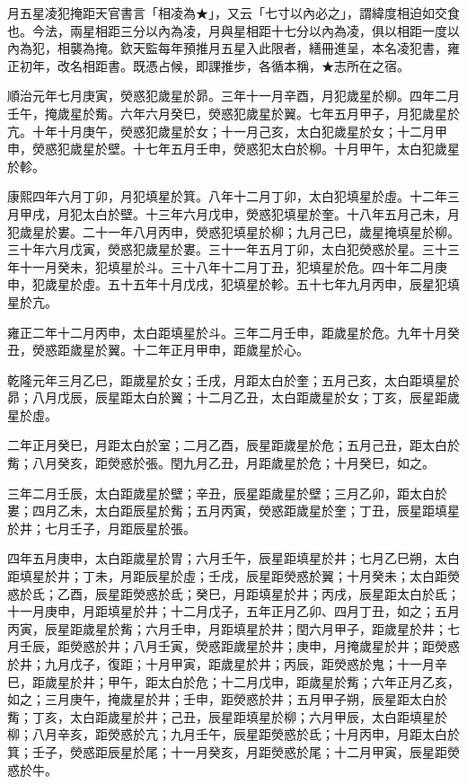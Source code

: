 \begin{pinyinscope}
月五星凌犯掩距天官書言「相凌為★」，又云「七寸以內必之」，謂緯度相迫如交食也。今法，兩星相距三分以內為凌，月與星相距十七分以內為凌，俱以相距一度以內為犯，相襲為掩。欽天監每年預推月五星入此限者，繕冊進呈，本名凌犯書，雍正初年，改名相距書。既憑占候，即課推步，各循本稱，★志所在之宿。

順治元年七月庚寅，熒惑犯歲星於昴。三年十一月辛酉，月犯歲星於柳。四年二月壬午，掩歲星於觜。六年六月癸巳，熒惑犯歲星於翼。七年五月甲子，月犯歲星於亢。十年十月庚午，熒惑犯歲星於女；十一月己亥，太白犯歲星於女；十二月甲申，熒惑犯歲星於壁。十七年五月壬申，熒惑犯太白於柳。十月甲午，太白犯歲星於軫。

康熙四年六月丁卯，月犯填星於箕。八年十二月丁卯，太白犯填星於虛。十二年三月甲戌，月犯太白於壁。十三年六月戊申，熒惑犯填星於奎。十八年五月己未，月犯歲星於婁。二十一年八月丙申，熒惑犯填星於柳；九月己巳，歲星掩填星於柳。三十年六月戊寅，熒惑犯歲星於婁。三十一年五月丁卯，太白犯熒惑於星。三十三年十一月癸未，犯填星於斗。三十八年十二月丁丑，犯填星於危。四十年二月庚申，犯歲星於虛。五十五年十月戊戌，犯填星於軫。五十七年九月丙申，辰星犯填星於亢。

雍正二年十二月丙申，太白距填星於斗。三年二月壬申，距歲星於危。九年十月癸丑，熒惑距歲星於翼。十二年正月甲申，距歲星於心。

乾隆元年三月乙巳，距歲星於女；壬戌，月距太白於奎；五月己亥，太白距填星於昴；八月戊辰，辰星距太白於翼；十二月乙丑，太白距歲星於女；丁亥，辰星距歲星於虛。

二年正月癸巳，月距太白於室；二月乙酉，辰星距歲星於危；五月己丑，距太白於觜；八月癸亥，距熒惑於張。閏九月乙丑，月距歲星於危；十月癸巳，如之。

三年二月壬辰，太白距歲星於壁；辛丑，辰星距歲星於壁；三月乙卯，距太白於婁；四月乙未，太白距辰星於觜；五月丙寅，熒惑距歲星於奎；丁丑，辰星距填星於井；七月壬子，月距辰星於張。

四年五月庚申，太白距歲星於胃；六月壬午，辰星距填星於井；七月乙巳朔，太白距填星於井；丁未，月距辰星於虛；壬戌，辰星距熒惑於翼；十月癸未；太白距熒惑於氐；乙酉，辰星距熒惑於氐；癸巳，月距填星於井；丙戌，辰星距太白於氐；十一月庚申，月距填星於井；十二月戊子，五年正月乙卯、四月丁丑，如之；五月丙寅，辰星距歲星於觜；六月壬申，月距填星於井；閏六月甲子，距歲星於井；七月壬辰，距熒惑於井；八月壬寅，熒惑距歲星於井；庚申，月掩歲星於井；距熒惑於井；九月戊子，復距；十月甲寅，距歲星於井；丙辰，距熒惑於鬼；十一月辛巳，距歲星於井；甲午，距太白於危；十二月戊申，距歲星於觜；六年正月乙亥，如之；三月庚午，掩歲星於井；壬申，距熒惑於井；五月甲子朔，辰星距太白於觜；丁亥，太白距歲星於井；己丑，辰星距填星於柳；六月甲辰，太白距填星於柳；八月辛亥，距熒惑於亢；九月壬午，辰星距熒惑於氐；十月丙申，月距太白於箕；壬子，熒惑距辰星於尾；十一月癸亥，月距熒惑於尾；十二月甲寅，辰星距熒惑於牛。


\end{pinyinscope}
